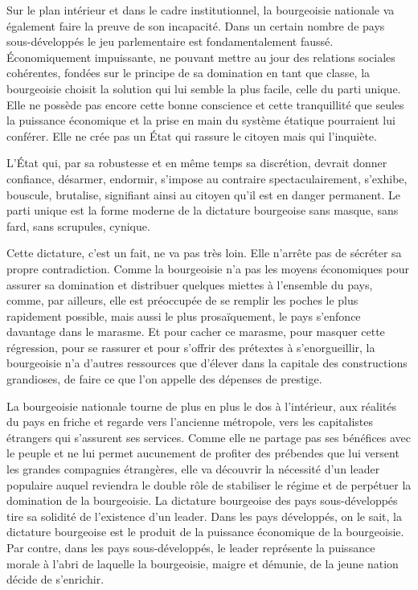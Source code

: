 \documentclass[french,twoside]{book} %
\begin{document}
\bigbreak
\noindent Sur le plan intérieur et dans le cadre institutionnel, la bourgeoisie nationale va également faire la preuve de son incapacité. Dans un certain nombre de pays sous-développés le jeu parlementaire est fondamentalement faussé. Économiquement impuissante, ne pouvant mettre au jour des relations sociales cohérentes, fondées sur le principe de sa domination en tant que classe, la bourgeoisie choisit la solution qui lui semble la plus facile, celle du parti unique. Elle ne possède pas encore cette bonne conscience et cette tranquillité que seules la puissance économique et la prise en main du système étatique pourraient lui conférer. Elle ne crée pas un État qui rassure le citoyen mais qui l’inquiète.\par
L’État qui, par sa robustesse et en même temps sa discrétion, devrait donner confiance, désarmer, endormir, s’impose au contraire spectaculairement, s’exhibe, bouscule, brutalise, signifiant ainsi au citoyen qu’il est en danger permanent. Le parti unique est la forme moderne de la dictature bourgeoise sans masque, sans fard, sans scrupules, cynique.\par
Cette dictature, c’est un fait, ne va pas très loin. Elle n’arrête pas de sécréter sa propre contradiction. Comme la bourgeoisie n’a pas les moyens économiques pour assurer sa domination et distribuer quelques miettes à l’ensemble du pays, comme, par ailleurs, elle est préoccupée de se remplir les poches le plus rapidement possible, mais aussi le plus prosaïquement, le pays s’enfonce davantage dans le marasme. Et pour cacher ce   marasme, pour masquer cette régression, pour se rassurer et pour s’offrir des prétextes à s’enorgueillir, la bourgeoisie n’a d’autres ressources que d’élever dans la capitale des constructions grandioses, de faire ce que l’on appelle des dépenses de prestige.\par
La bourgeoisie nationale tourne de plus en plus le dos à l’intérieur, aux réalités du pays en friche et regarde vers l’ancienne métropole, vers les capitalistes étrangers qui s’assurent ses services. Comme elle ne partage pas ses bénéfices avec le peuple et ne lui permet aucunement de profiter des prébendes que lui versent les grandes compagnies étrangères, elle va découvrir la nécessité d’un leader populaire auquel reviendra le double rôle de stabiliser le régime et de perpétuer la domination de la bourgeoisie. La dictature bourgeoise des pays sous-développés tire sa solidité de l’existence d’un leader. Dans les pays développés, on le sait, la dictature bourgeoise est le produit de la puissance économique de la bourgeoisie. Par contre, dans les pays sous-développés, le leader représente la puissance morale à l’abri de laquelle la bourgeoisie, maigre et démunie, de la jeune nation décide de s’enrichir.\par
\end{document}
